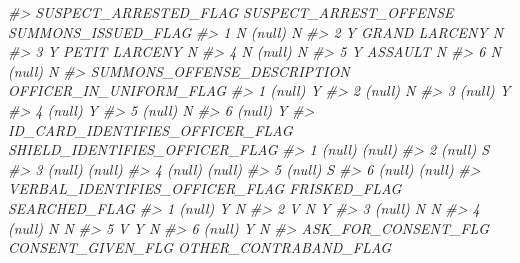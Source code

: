 \documentclass[
]{krantz}
\makeatletter
\newenvironment{Shaded}{\begin{snugshade}}{\end{snugshade}}
\newcommand{\CommentTok}[1]{\textcolor[rgb]{0.37,0.37,0.37}{\textit{#1}}}
\newenvironment{kframe}{%
\medskip{}
\setlength{\fboxsep}{.8em}
 \def\at@end@of@kframe{}%
 \ifinner\ifhmode%
  \def\at@end@of@kframe{\end{minipage}}%
  \begin{minipage}{\columnwidth}%
 \fi\fi%
 \def\FrameCommand##1{\hskip\@totalleftmargin \hskip-\fboxsep
 \colorbox{shadecolor}{##1}\hskip-\fboxsep
     \hskip-\linewidth \hskip-\@totalleftmargin \hskip\columnwidth}%
 \MakeFramed {\advance\hsize-\width
   \@totalleftmargin\z@ \linewidth\hsize
   \@setminipage}}%
 {\par\unskip\endMakeFramed%
 \at@end@of@kframe}
\renewenvironment{Shaded}{\begin{kframe}}{\end{kframe}}
\makeatother
\begin{document}
\begin{Shaded}
\begin{Highlighting}[]
\CommentTok{\#\textgreater{}   SUSPECT\_ARRESTED\_FLAG SUSPECT\_ARREST\_OFFENSE SUMMONS\_ISSUED\_FLAG}
\CommentTok{\#\textgreater{} 1                     N                 (null)                   N}
\CommentTok{\#\textgreater{} 2                     Y          GRAND LARCENY                   N}
\CommentTok{\#\textgreater{} 3                     Y          PETIT LARCENY                   N}
\CommentTok{\#\textgreater{} 4                     N                 (null)                   N}
\CommentTok{\#\textgreater{} 5                     Y                ASSAULT                   N}
\CommentTok{\#\textgreater{} 6                     N                 (null)                   N}
\CommentTok{\#\textgreater{}   SUMMONS\_OFFENSE\_DESCRIPTION OFFICER\_IN\_UNIFORM\_FLAG}
\CommentTok{\#\textgreater{} 1                      (null)                       Y}
\CommentTok{\#\textgreater{} 2                      (null)                       N}
\CommentTok{\#\textgreater{} 3                      (null)                       Y}
\CommentTok{\#\textgreater{} 4                      (null)                       Y}
\CommentTok{\#\textgreater{} 5                      (null)                       N}
\CommentTok{\#\textgreater{} 6                      (null)                       Y}
\CommentTok{\#\textgreater{}   ID\_CARD\_IDENTIFIES\_OFFICER\_FLAG SHIELD\_IDENTIFIES\_OFFICER\_FLAG}
\CommentTok{\#\textgreater{} 1                          (null)                         (null)}
\CommentTok{\#\textgreater{} 2                          (null)                              S}
\CommentTok{\#\textgreater{} 3                          (null)                         (null)}
\CommentTok{\#\textgreater{} 4                          (null)                         (null)}
\CommentTok{\#\textgreater{} 5                          (null)                              S}
\CommentTok{\#\textgreater{} 6                          (null)                         (null)}
\CommentTok{\#\textgreater{}   VERBAL\_IDENTIFIES\_OFFICER\_FLAG FRISKED\_FLAG SEARCHED\_FLAG}
\CommentTok{\#\textgreater{} 1                         (null)            Y             N}
\CommentTok{\#\textgreater{} 2                              V            N             Y}
\CommentTok{\#\textgreater{} 3                         (null)            N             N}
\CommentTok{\#\textgreater{} 4                         (null)            N             N}
\CommentTok{\#\textgreater{} 5                              V            Y             N}
\CommentTok{\#\textgreater{} 6                         (null)            Y             N}
\CommentTok{\#\textgreater{}   ASK\_FOR\_CONSENT\_FLG CONSENT\_GIVEN\_FLG OTHER\_CONTRABAND\_FLAG}

\end{Highlighting}
\end{Shaded}
\end{document}
